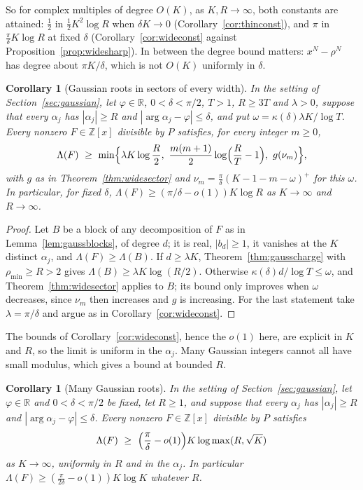 \documentclass[11pt]{article}
\newtheorem{corollary}[theorem]{Corollary}
\newcommand{\R}{\mathbb R}
\begin{document}
So for complex multiples of degree $O(K)$, as $K,R\to\infty$, both constants
are attained: $\frac12$ in $\frac12K^2\log R$ when $\delta K\to0$
(Corollary~\ref{cor:thinconst}), and $\pi$ in $\frac\pi\delta K\log R$ at
fixed $\delta$ (Corollary~\ref{cor:wideconst} against
Proposition~\ref{prop:widesharp}).  In between the degree bound matters:
$x^N-\rho^N$ has degree about $\pi K/\delta$, which is not $O(K)$ uniformly
in $\delta$.

\begin{corollary}[Gaussian roots in sectors of every width]\label{cor:widegauss}
In the setting of Section~\ref{sec:gaussian}, let $\varphi\in\R$,
$0<\delta<\pi/2$, $T>1$, $R\ge3T$ and $\lambda>0$, suppose that every
$\alpha_j$ has $|\alpha_j|\ge R$ and $|\arg\alpha_j-\varphi|\le\delta$, and put
$\omega=\kappa(\delta)\lambda K/\log T$.  Every nonzero $F\in\mathbb Z[x]$ divisible
by $P$ satisfies, for every integer $m\ge0$,
\[
  \Lambda(F)\ \ge\ \min\Bigl\{\lambda K\log\frac R2,\
  \frac{m(m+1)}2\log\Bigl(\frac RT-1\Bigr),\ g(\nu_m)\Bigr\},
\]
with $g$ as in Theorem~\ref{thm:widesector} and
$\nu_m=\frac\pi\delta(K-1-m-\omega)^+$ for this $\omega$.  In particular, for fixed
$\delta$, $\Lambda(F)\ge(\pi/\delta-o(1))K\log R$ as $K\to\infty$ and
$R\to\infty$.
\end{corollary}

\begin{proof}
Let $B$ be a block of any decomposition of $F$ as in
Lemma~\ref{lem:gaussblocks}, of degree $d$; it is
real, $|b_d|\ge1$, it vanishes at the $K$ distinct $\alpha_j$, and
$\Lambda(F)\ge\Lambda(B)$.  If $d\ge\lambda K$, Theorem~\ref{thm:gausscharge}
with $\rho_{\min}\ge R>2$ gives $\Lambda(B)\ge\lambda K\log(R/2)$.  Otherwise
$\kappa(\delta)d/\log T\le\omega$, and Theorem~\ref{thm:widesector} applies to $B$;
its bound only improves when $\omega$ decreases, since $\nu_m$ then
increases and $g$ is increasing.  For the last statement take
$\lambda=\pi/\delta$ and argue as in Corollary~\ref{cor:wideconst}.
\end{proof}

The bounds of Corollary~\ref{cor:wideconst}, hence the $o(1)$ here, are
explicit in $K$ and $R$, so the limit is uniform in the $\alpha_j$.  Many
Gaussian integers cannot all have small modulus, which gives a bound
at bounded $R$.

\begin{corollary}[Many Gaussian roots]\label{cor:gausscount}
In the setting of Section~\ref{sec:gaussian}, let $\varphi\in\R$ and
$0<\delta<\pi/2$ be fixed, let $R\ge1$, and suppose that every $\alpha_j$
has $|\alpha_j|\ge R$ and $|\arg\alpha_j-\varphi|\le\delta$.  Every nonzero
$F\in\mathbb Z[x]$ divisible by $P$ satisfies
\[
  \Lambda(F)\ \ge\ \Bigl(\frac\pi\delta-o(1)\Bigr)K\log\max(R,\sqrt K)
\]
as $K\to\infty$, uniformly in $R$ and in the $\alpha_j$.  In particular
$\Lambda(F)\ge(\frac\pi{2\delta}-o(1))K\log K$ whatever $R$.
\end{corollary}
\end{document}
